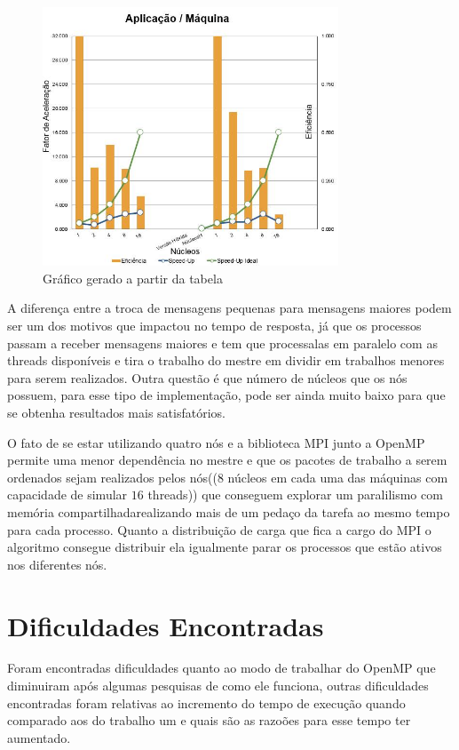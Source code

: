 \documentclass[10pt]{IEEEtran}
\begin{document}
	\begin{figure}[H]
		\centering
		\includegraphics[width=88mm]{graph.png}
		\caption{Gráfico gerado a partir da tabela}
		\label{fig_table}
	\end{figure}

	A diferença entre a troca de mensagens pequenas para mensagens maiores 
	podem ser um dos motivos que impactou no tempo de resposta, já que os processos
	passam a receber mensagens maiores e tem que processalas em paralelo com as 
	threads disponíveis e tira o trabalho do mestre em dividir em trabalhos
	menores para serem realizados. Outra questão é que número de núcleos que os nós 
	possuem, para esse tipo de implementação, pode ser ainda muito baixo para que se 
	obtenha resultados mais satisfatórios. 

	O fato de se estar utilizando quatro nós e a biblioteca MPI junto a OpenMP permite 
	uma menor dependência no mestre e que os pacotes de trabalho a serem ordenados sejam
	realizados pelos nós(($8$ núcleos em cada uma das máquinas com capacidade de simular $16$ 
	threads)) que conseguem explorar um paralilismo com memória compartilhadarealizando
	mais de um pedaço da tarefa ao mesmo tempo para cada processo. Quanto a	distribuição de 
	carga que fica a cargo do MPI o algoritmo consegue distribuir ela igualmente parar 
	os processos que estão ativos nos diferentes nós.

\section{Dificuldades Encontradas}

	Foram encontradas dificuldades quanto ao modo de trabalhar do OpenMP que diminuiram após algumas
	pesquisas de como ele funciona, outras dificuldades encontradas foram relativas ao incremento do tempo
	de execução quando comparado aos do trabalho um e quais são as razoões para esse tempo ter aumentado\@.
\end{document}
